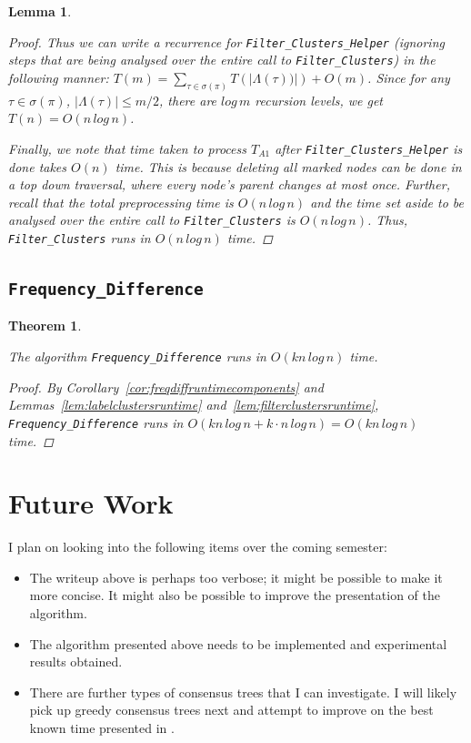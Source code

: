\documentclass{article}
\newcommand{\leafset}{\Lambda}
\newtheorem{filterclustersruntime}[incompatibility]{Lemma}
\newtheorem{freqdiffruntime}[incompatibility]{Theorem}
\begin{document}
\begin{filterclustersruntime}
\begin{proof}
            Thus we can write a recurrence for \texttt{Filter\_Clusters\_Helper} (ignoring steps that are being analysed over the entire call to \texttt{Filter\_Clusters}) in the following manner: $T(m) = \sum_{\tau \in \sigma(\pi)}T(|\leafset(\tau))|) + O(m)$. Since for any $\tau \in \sigma(\pi)$, $|\leafset(\tau)| \leq m/2$, there are $log\,m$ recursion levels, we get $T(n) = O(n\,log\,n)$.

            Finally, we note that time taken to process $T_{A1}$ after \texttt{Filter\_Clusters\_Helper} is done takes $O(n)$ time. This is because deleting all marked nodes can be done in a top down traversal, where every node's parent changes at most once. Further, recall that the total preprocessing time is $O(n\,log\,n)$ and the time set aside to be analysed over the entire call to \texttt{Filter\_Clusters} is $O(n\,log\,n)$. Thus, \texttt{Filter\_Clusters} runs in $O(n\,log\,n)$ time.
        \end{proof}
    \end{filterclustersruntime}

    \subsection{\texttt{Frequency\_Difference}}

    \begin{freqdiffruntime}
        \label{theorem:freqdiffruntime}

        The algorithm \texttt{Frequency\_Difference} runs in $O(kn\,log\,n)$ time.

        \begin{proof}
            By Corollary~\ref{cor:freqdiffruntimecomponents} and Lemmas~\ref{lem:labelclustersruntime} and~\ref{lem:filterclustersruntime}, \texttt{Frequency\_Difference} runs in $O(kn\,log\,n + k \cdot n\,log\,n) = O(kn\,log\,n)$ time.
        \end{proof}
    \end{freqdiffruntime}

    \section{Future Work}
    \label{sec:futurework}

    I plan on looking into the following items over the coming semester:
    \begin{itemize}
        \item The writeup above is perhaps too verbose; it might be possible to make it more concise. It might also be possible to improve the presentation of the algorithm.
        \item The algorithm presented above needs to be implemented and experimental results obtained.
        \item There are further types of consensus trees that I can investigate. I will likely pick up greedy consensus trees next and attempt to improve on the best known time presented in \cite{gawrychowski2017faster}.
    \end{itemize}

    \newpage
    
    
\end{document}
